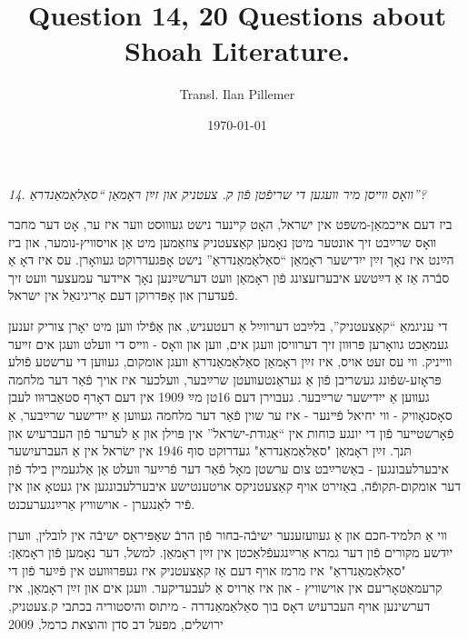 \documentclass{article}
\begin{document}
\renewcommand{\abstractname}{\vspace{-\baselineskip}}
\title{Question 14, 20 Questions about Shoah Literature.}
\author{Transl. Ilan Pillemer}
\date{\today}

\maketitle
{}
\newline

\begin{pairs}

\begin{Rightside}

\begin{RTL}
\begin{hebrew}
\beginnumbering
\autopar
\emph{
14.
װאָס װײסן מיר װעגען די שריפֿטן פֿון ק. צעטניק און זײַן ראָמאַן ``סאַלאַמאַנדראַ''?
}
\newline

ביז דעם אײכמאַן-משפּט אין ישראל, האָט קײנער נישט געװוּסט װער איז ער, אָט דער מחבר װאָס שרײַבט זיך אונטער מיטן נאָמען קאַצעטניק צוזאַמען מיט אַן אויסװיץ-נומער,
און ביז הײַנט איז נאָך זײַן ייִדישער ראָמאַן ``סאַלאַמאַנדראַ'' נישט אָפּגעדרוקט געװאָרן.
עס איז דאָ אַ סבֿרה אַז אַ דײַטשע איבערזעצונג פֿון ראָמאַן װעט דערשײַנען נאָך אײדער עמעצער װעט זיך פֿעדערן און אָפּדרוקן דעם אָריגינאַל אין ישראל.


די עניגמאַ ``קאַצעטניק'', בלײַבט דערװײַל אַ רעטעניש, און אַפֿילו װען מיט יאָרן צוריק זענען געמאַכט גװאָרען פּרוּװן זיך דערװיסן װעגן אים, װען און װאָס -
װײס די װעלט װעגן אים זײער װײניק.
װי עס זעט אויס, איז זײַן ראָמאַן סאַלאַמאַנדראַ װעגן אומקום, געװען די ערשטע פֿולע פּראָזע-שפֿונג געשריבן פֿון אַ געראַנטעװעטן שרײַבער, װעלכער איז אויך פֿאַר דער מלחמה
געװען אַ ייִדישער שרײַבער. 
געבוירן דעם 16טן מײַ 1909 אין דעם דאָרף סטאַברוּװ לעבן סאָסנאָװיק -
װי יחיאל פֿײנער - איז ער שוין פֿאַר דער מלחמה געװען אַ ייִדישער שרײַבער, אַ פֿאָרשטײער פֿון די יונגע כּוחות אין ``אַגודת-ישׂראל'' אין פּוילן 
און אַ לערער פֿון העברעיִש און תּנך.
זײַן ראָמאַן "סאַלאַמאַנדראַ" געדרוקט סוף 1946 אין ישׂראל אין אַ העברעיִשער איבערלעבונגען -
באַשרײַבט צום ערשטן מאָל פֿאַר דער פֿרײַער װעלט אַן אַלגעמײן בילד פֿון דער אומקום-תּקופֿה, 
באַזירט אויף קאַצעטניקס אויטענטישע איבערלעבונגען אין געטאָ און אין פֿיר לאַנגערן - אוישװיץ אַרײַנגערעכנט.


װי אַ תּלמיד-חכם און אַ געװעזענער ישיבֿה-בחור פֿון הרבֿ שאַפּיראַס ישיבֿה אין לובלין, װערן ייִדשע  מקורים פֿון דער גמרא אַרײַנגעפֿלאַכטן אין זײַן ראָמאַן.
למשל, דער נאָמען פֿון ראָמאַן: "סאַלאַמאַנדראַ" איז מרמז אויף דעם אַז קאַצעטניק איז געפּרוּװעט אין פֿײַער פֿון די קרעמאַטאָריעם אין אוישװיץ - און 
איז אַרויס אַ לעבעדיקער. 
װעגן אים און זײַן  ראָמאַן, איז דערשינען אויף העברעיִש דאָס בוך סאַלאַמאַנדרה - מיתוס והיסטוריה בכתבי ק.צעטניק, ירושלים,  מפעל דב סדן והוצאת כרמל, 2009


\end{hebrew}
\end{RTL}
\end{Rightside}
\end{pairs}
\end{document}
